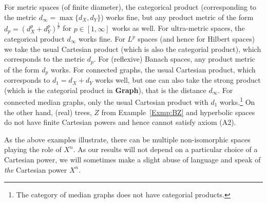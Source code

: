 \documentclass[a4paper]{article}
\theoremstyle{definition}
\newcommand*{\category}[1]{\textbf{#1}}
\begin{document}
For metric spaces (of finite diameter), the categorical product (corresponding to the metric $d_\infty=\max\{d_X,d_Y\}$) works fine, but any product metric of the form $d_p=(d_X^p+d_Y^p)^{\frac1p}$ for $p\in[1,\infty]$ works as well.
For ultra-metric spaces, the categorical product $d_\infty$ works fine.
For $L^p$ spaces (and hence for Hilbert spaces) we take the usual Cartesian product (which is also the categorial product), which corresponds to the metric $d_p$.
For (reflexive) Banach spaces, any product metric of the form $d_p$ works.
For connected graphs, the usual Cartesian product, which corresponds to $d_1=d_X+d_Y$ works well, but one can also take the strong product (which is the categorial product in \category{Graph}), that is the distance $d_\infty$.
For connected median graphs, only the usual Cartesian product with $d_1$ works.\footnote{The category of median graphs does not have categorial products.}
On the other hand, (real) trees, $Z$ from Example~\ref{Exmp:BZ} and hyperbolic spaces do not have finite Cartesian powers and hence cannot satisfy axiom (A2).

As the above examples illustrate, there can be multiple non-isomorphic spaces playing the role of $X^n$. As our results will not depend on a particular choice of a Cartesian power, we will sometimes make a slight abuse of language and speak of \emph{the} Cartesian power $X^n$.
\end{document}
